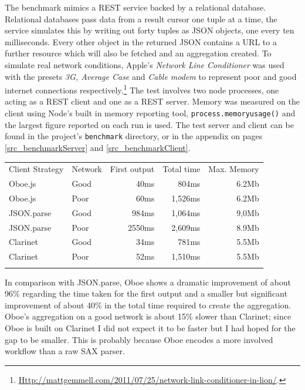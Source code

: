\documentclass[]{article}
\begin{document}
The benchmark mimics a REST service backed by a relational database.
Relational databases pass data from a result cursor one tuple at a time,
the service simulates this by writing out forty tuples as JSON objects,
one every ten milliseconds. Every other object in the returned JSON
contains a URL to a further resource which will also be fetched and an
aggregation created. To simulate real network conditions, Apple's
\emph{Network Line Conditioner} was used with the presets \emph{3G,
Average Case} and \emph{Cable modem} to represent poor and good internet
connections respectively.\footnote{\href{http://mattgemmell.com/2011/07/25/network-link-conditioner-in-lion/}{Http://mattgemmell.com/2011/07/25/network-link-conditioner-in-lion/}.}
The test involves two node processes, one acting as a REST client and
one as a REST server. Memory was measured on the client using Node's
built in memory reporting tool, \texttt{process.memoryusage()} and the
largest figure reported on each run is used. The test server and client
can be found in the project's \texttt{benchmark} directory, or in the
appendix on pages \ref{src_benchmarkServer} and
\ref{src_benchmarkClient}.

\begin{longtable}[c]{@{}llrrr@{}}
\hline\noalign{\medskip}
Client Strategy & Network & First output & Total time & Max. Memory
\\\noalign{\medskip}
\hline\noalign{\medskip}
Oboe.js & Good & 40ms & 804ms & 6.2Mb
\\\noalign{\medskip}
Oboe.js & Poor & 60ms & 1,526ms & 6.2Mb
\\\noalign{\medskip}
JSON.parse & Good & 984ms & 1,064ms & 9,0Mb
\\\noalign{\medskip}
JSON.parse & Poor & 2550ms & 2,609ms & 8.9Mb
\\\noalign{\medskip}
Clarinet & Good & 34ms & 781ms & 5.5Mb
\\\noalign{\medskip}
Clarinet & Poor & 52ms & 1,510ms & 5.5Mb
\\\noalign{\medskip}
\hline
\end{longtable}

In comparison with JSON.parse, Oboe shows a dramatic improvement of
about 96\% regarding the time taken for the first output and a smaller
but significant improvement of about 40\% in the total time required to
create the aggregation. Oboe's aggregation on a good network is about
15\% slower than Clarinet; since Oboe is built on Clarinet I did not
expect it to be faster but I had hoped for the gap to be smaller. This
is probably because Oboe encodes a more involved workflow than a raw SAX
parser.
\end{document}
